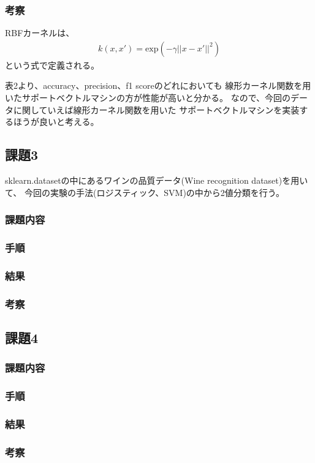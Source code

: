 \documentclass[12pt]{jarticle}
\begin{document}
\clearpage

\subsubsection*{考察}

RBFカーネルは、
\begin{eqnarray}
    k(x,x') = \text{exp}(-\gamma || x - x' ||^2) \nonumber
\end{eqnarray}
という式で定義される。

表2より、accuracy、precision、f1 scoreのどれにおいても
線形カーネル関数を用いたサポートベクトルマシンの方が性能が高いと分かる。
なので、今回のデータに関していえば線形カーネル関数を用いた
サポートベクトルマシンを実装するほうが良いと考える。

\subsection{課題3}
sklearn.datasetの中にあるワインの品質データ(Wine recognition dataset)を用いて、
今回の実験の手法(ロジスティック、SVM)の中から2値分類を行う。
\subsubsection*{課題内容}
\subsubsection*{手順}
\subsubsection*{結果}
\subsubsection*{考察}
\subsection{課題4}
\subsubsection*{課題内容}
\subsubsection*{手順}
\subsubsection*{結果}
\subsubsection*{考察}
\end{document}
